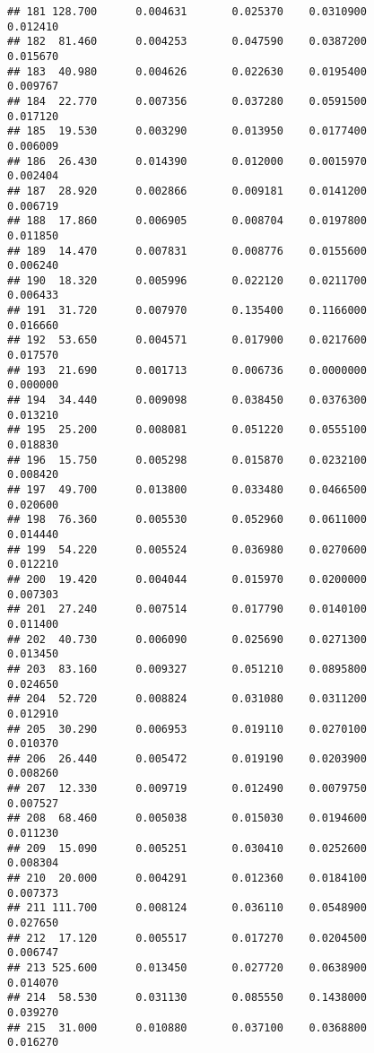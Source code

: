 \documentclass[
]{article}
\begin{document}
\begin{verbatim}
## 181 128.700      0.004631       0.025370    0.0310900          0.012410
## 182  81.460      0.004253       0.047590    0.0387200          0.015670
## 183  40.980      0.004626       0.022630    0.0195400          0.009767
## 184  22.770      0.007356       0.037280    0.0591500          0.017120
## 185  19.530      0.003290       0.013950    0.0177400          0.006009
## 186  26.430      0.014390       0.012000    0.0015970          0.002404
## 187  28.920      0.002866       0.009181    0.0141200          0.006719
## 188  17.860      0.006905       0.008704    0.0197800          0.011850
## 189  14.470      0.007831       0.008776    0.0155600          0.006240
## 190  18.320      0.005996       0.022120    0.0211700          0.006433
## 191  31.720      0.007970       0.135400    0.1166000          0.016660
## 192  53.650      0.004571       0.017900    0.0217600          0.017570
## 193  21.690      0.001713       0.006736    0.0000000          0.000000
## 194  34.440      0.009098       0.038450    0.0376300          0.013210
## 195  25.200      0.008081       0.051220    0.0555100          0.018830
## 196  15.750      0.005298       0.015870    0.0232100          0.008420
## 197  49.700      0.013800       0.033480    0.0466500          0.020600
## 198  76.360      0.005530       0.052960    0.0611000          0.014440
## 199  54.220      0.005524       0.036980    0.0270600          0.012210
## 200  19.420      0.004044       0.015970    0.0200000          0.007303
## 201  27.240      0.007514       0.017790    0.0140100          0.011400
## 202  40.730      0.006090       0.025690    0.0271300          0.013450
## 203  83.160      0.009327       0.051210    0.0895800          0.024650
## 204  52.720      0.008824       0.031080    0.0311200          0.012910
## 205  30.290      0.006953       0.019110    0.0270100          0.010370
## 206  26.440      0.005472       0.019190    0.0203900          0.008260
## 207  12.330      0.009719       0.012490    0.0079750          0.007527
## 208  68.460      0.005038       0.015030    0.0194600          0.011230
## 209  15.090      0.005251       0.030410    0.0252600          0.008304
## 210  20.000      0.004291       0.012360    0.0184100          0.007373
## 211 111.700      0.008124       0.036110    0.0548900          0.027650
## 212  17.120      0.005517       0.017270    0.0204500          0.006747
## 213 525.600      0.013450       0.027720    0.0638900          0.014070
## 214  58.530      0.031130       0.085550    0.1438000          0.039270
## 215  31.000      0.010880       0.037100    0.0368800          0.016270

\end{verbatim}
\end{document}
